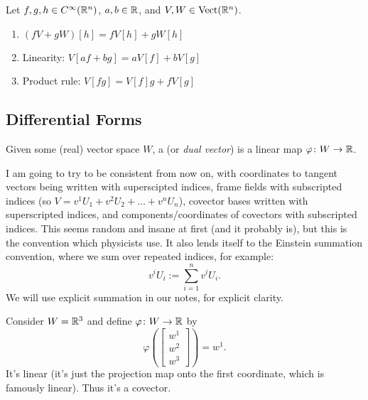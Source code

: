 \begin{proposition}
Let $f,g,h\in C^{\infty}(\mathbb{R}^{n})$, $a,b\in\mathbb{R}$, and $V,W\in\operatorname{Vect}(\mathbb{R}^{n})$.
\begin{enumerate}
\item $(fV + gW)[h] = fV[h] + gW[h]$
\item Linearity: $V[af + bg] = aV[f] + bV[g]$
\item Product rule: $V[fg] = V[f]g + fV[g]$
\end{enumerate}
\end{proposition}

\subsection{Differential Forms}

\begin{definition}
Given some (real) vector space $W$, a  (or \emph{dual vector})
is a linear map $\varphi\colon W\to\mathbb{R}$.
\end{definition}

I am going to try to be consistent from now on, with coordinates to
tangent vectors being written with superscipted indices, frame fields
with subscripted indices (so $V = v^{1}U_{1} + v^{2}U_{2} + \dots + v^{n}U_{n}$),
covector bases written with superscripted indices, and
components/coordinates of covectors with subscripted indices. This seems
random and insane at first (and it probably is), but this is the
convention which physicists use. It also lends itself to the Einstein
summation convention, where we sum over repeated indices, for example:
\begin{equation}
v^{i}U_{i} := \sum^{n}_{i=1}v^{i}U_{i}.
\end{equation}
We will use explicit summation in our notes, for explicit clarity.

\begin{example}
  Consider $W=\mathbb{R}^{3}$ and define $\varphi\colon W\to\mathbb{R}$ by
  \begin{equation}
\varphi\left(\begin{bmatrix}w^{1}\\ w^{2}\\ w^{3}
\end{bmatrix}\right) = w^{1}.
  \end{equation}
  It's linear (it's just the projection map onto the first coordinate,
  which is famously linear). Thus it's a covector.
\end{example}

